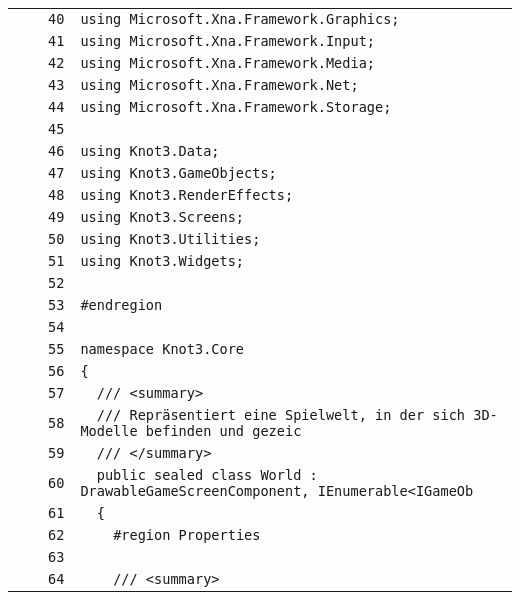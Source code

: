 \documentclass[a4paper,10pt]{article}
\begin{document}
\begin{longtable}[l]{lrrl}
\cellcolor{gray} &  & \verb~40~ & \verb~using Microsoft.Xna.Framework.Graphics;~\\
\cellcolor{gray} &  & \verb~41~ & \verb~using Microsoft.Xna.Framework.Input;~\\
\cellcolor{gray} &  & \verb~42~ & \verb~using Microsoft.Xna.Framework.Media;~\\
\cellcolor{gray} &  & \verb~43~ & \verb~using Microsoft.Xna.Framework.Net;~\\
\cellcolor{gray} &  & \verb~44~ & \verb~using Microsoft.Xna.Framework.Storage;~\\
\cellcolor{gray} &  & \verb~45~ & \verb~~\\
\cellcolor{gray} &  & \verb~46~ & \verb~using Knot3.Data;~\\
\cellcolor{gray} &  & \verb~47~ & \verb~using Knot3.GameObjects;~\\
\cellcolor{gray} &  & \verb~48~ & \verb~using Knot3.RenderEffects;~\\
\cellcolor{gray} &  & \verb~49~ & \verb~using Knot3.Screens;~\\
\cellcolor{gray} &  & \verb~50~ & \verb~using Knot3.Utilities;~\\
\cellcolor{gray} &  & \verb~51~ & \verb~using Knot3.Widgets;~\\
\cellcolor{gray} &  & \verb~52~ & \verb~~\\
\cellcolor{gray} &  & \verb~53~ & \verb~#endregion~\\
\cellcolor{gray} &  & \verb~54~ & \verb~~\\
\cellcolor{gray} &  & \verb~55~ & \verb~namespace Knot3.Core~\\
\cellcolor{gray} &  & \verb~56~ & \verb~{~\\
\cellcolor{gray} &  & \verb~57~ & \verb~  /// <summary>~\\
\cellcolor{gray} &  & \verb~58~ & \verb~  /// Repräsentiert eine Spielwelt, in der sich 3D-Modelle befinden und gezeic~\\
\cellcolor{gray} &  & \verb~59~ & \verb~  /// </summary>~\\
\cellcolor{gray} &  & \verb~60~ & \verb~  public sealed class World : DrawableGameScreenComponent, IEnumerable<IGameOb~\\
\cellcolor{gray} &  & \verb~61~ & \verb~  {~\\
\cellcolor{gray} &  & \verb~62~ & \verb~    #region Properties~\\
\cellcolor{gray} &  & \verb~63~ & \verb~~\\
\cellcolor{gray} &  & \verb~64~ & \verb~    /// <summary>~\\

\end{longtable}
\end{document}
